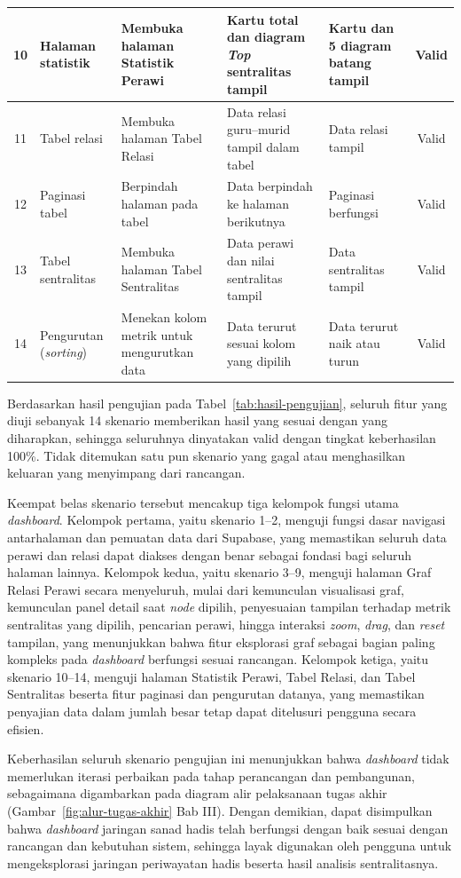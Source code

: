 \begin{table}[H]
{\begin{tabular}{|c|p{2.4cm}|p{3.6cm}|p{3.6cm}|p{3cm}|c|}
\hline
10 & Halaman statistik & Membuka halaman Statistik Perawi & Kartu total dan diagram \textit{Top} sentralitas tampil & Kartu dan 5 diagram batang tampil & Valid \\
\hline
11 & Tabel relasi & Membuka halaman Tabel Relasi & Data relasi guru--murid tampil dalam tabel & Data relasi tampil & Valid \\
\hline
12 & Paginasi tabel & Berpindah halaman pada tabel & Data berpindah ke halaman berikutnya & Paginasi berfungsi & Valid \\
\hline
13 & Tabel sentralitas & Membuka halaman Tabel Sentralitas & Data perawi dan nilai sentralitas tampil & Data sentralitas tampil & Valid \\
\hline
14 & Pengurutan (\textit{sorting}) & Menekan kolom metrik untuk mengurutkan data & Data terurut sesuai kolom yang dipilih & Data terurut naik atau turun & Valid \\
\hline
\end{tabular}%
}
\end{table}

Berdasarkan hasil pengujian pada Tabel~\ref{tab:hasil-pengujian}, seluruh fitur yang diuji sebanyak 14 skenario memberikan hasil yang sesuai dengan yang diharapkan, sehingga seluruhnya dinyatakan valid dengan tingkat keberhasilan 100\%. Tidak ditemukan satu pun skenario yang gagal atau menghasilkan keluaran yang menyimpang dari rancangan.

Keempat belas skenario tersebut mencakup tiga kelompok fungsi utama \textit{dashboard}. Kelompok pertama, yaitu skenario 1--2, menguji fungsi dasar navigasi antarhalaman dan pemuatan data dari Supabase, yang memastikan seluruh data perawi dan relasi dapat diakses dengan benar sebagai fondasi bagi seluruh halaman lainnya. Kelompok kedua, yaitu skenario 3--9, menguji halaman Graf Relasi Perawi secara menyeluruh, mulai dari kemunculan visualisasi graf, kemunculan panel detail saat \textit{node} dipilih, penyesuaian tampilan terhadap metrik sentralitas yang dipilih, pencarian perawi, hingga interaksi \textit{zoom}, \textit{drag}, dan \textit{reset} tampilan, yang menunjukkan bahwa fitur eksplorasi graf sebagai bagian paling kompleks pada \textit{dashboard} berfungsi sesuai rancangan. Kelompok ketiga, yaitu skenario 10--14, menguji halaman Statistik Perawi, Tabel Relasi, dan Tabel Sentralitas beserta fitur paginasi dan pengurutan datanya, yang memastikan penyajian data dalam jumlah besar tetap dapat ditelusuri pengguna secara efisien.

Keberhasilan seluruh skenario pengujian ini menunjukkan bahwa \textit{dashboard} tidak memerlukan iterasi perbaikan pada tahap perancangan dan pembangunan, sebagaimana digambarkan pada diagram alir pelaksanaan tugas akhir (Gambar~\ref{fig:alur-tugas-akhir} Bab III). Dengan demikian, dapat disimpulkan bahwa \textit{dashboard} jaringan sanad hadis telah berfungsi dengan baik sesuai dengan rancangan dan kebutuhan sistem, sehingga layak digunakan oleh pengguna untuk mengeksplorasi jaringan periwayatan hadis beserta hasil analisis sentralitasnya.

